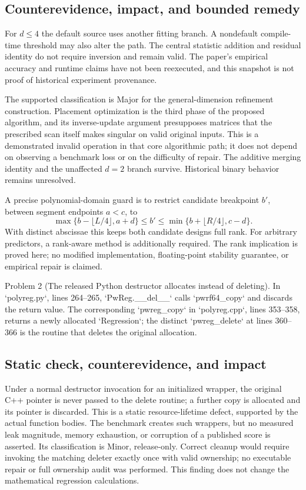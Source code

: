 \documentclass[10pt]{article}
\begin{document}
\subsection*{Counterevidence, impact, and bounded remedy}
For \(d\leq4\) the default source uses another fitting branch. A nondefault compile-time threshold may also alter the path. The central statistic addition and residual identity do not require inversion and remain valid. The paper’s empirical accuracy and runtime claims have not been reexecuted, and this snapshot is not proof of historical experiment provenance.\par
The supported classification is Major for the general-dimension refinement construction. Placement optimization is the third phase of the proposed algorithm, and its inverse-update argument presupposes matrices that the prescribed scan itself makes singular on valid original inputs. This is a demonstrated invalid operation in that core algorithmic path; it does not depend on observing a benchmark loss or on the difficulty of repair. The additive merging identity and the unaffected \(d=2\) branch survive. Historical binary behavior remains unresolved.\par
A precise polynomial-domain guard is to restrict candidate breakpoint \(b'\), between segment endpoints \(a<c\), to \[\max\{b-\lfloor L/4\rfloor,a+d\}
 \leq b'\leq
 \min\{b+\lfloor R/4\rfloor,c-d\}.\] With distinct abscissae this keeps both candidate designs full rank. For arbitrary predictors, a rank-aware method is additionally required. The rank implication is proved here; no modified implementation, floating-point stability guarantee, or empirical repair is claimed.\par
Problem 2 (The released Python destructor allocates instead of deleting).  In `polyreg.py`, lines 264–265, `PwReg.\_\_del\_\_` calls `pwrf64\_copy` and discards the return value. The corresponding `pwreg\_copy` in `polyreg.cpp`, lines 353–358, returns a newly allocated `Regression`; the distinct `pwreg\_delete` at lines 360–366 is the routine that deletes the original allocation.\par
\subsection*{Static check, counterevidence, and impact}
Under a normal destructor invocation for an initialized wrapper, the original C++ pointer is never passed to the delete routine; a further copy is allocated and its pointer is discarded. This is a static resource-lifetime defect, supported by the actual function bodies. The benchmark creates such wrappers, but no measured leak magnitude, memory exhaustion, or corruption of a published score is asserted. Its classification is Minor, release-only. Correct cleanup would require invoking the matching deleter exactly once with valid ownership; no executable repair or full ownership audit was performed. This finding does not change the mathematical regression calculations.\par
\end{document}
